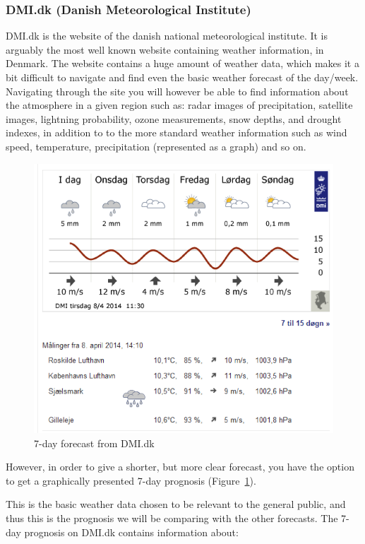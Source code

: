 

\subsubsection*{DMI.dk (Danish Meteorological Institute)} %
\label{ssub:dmi_dk_danish_meteorological_institute_}

DMI.dk is the website of the danish national meteorological institute. 
It is arguably the most well known website containing weather information, in Denmark. 
The website contains a huge amount of weather data, which makes it a bit difficult to navigate and find even the basic weather forecast of the day/week. 
Navigating through the site you will however be able to find information about the atmosphere in a given region such as:
radar images of precipitation, satellite images, lightning probability, ozone measurements, snow depths, and drought indexes, in addition to to the more standard weather information such as wind speed, temperature, precipitation (represented as a graph) and so on. 

\begin{figure}[!htbp]
     \centering
     \includegraphics[width=.75\textwidth]{images/Dmi1.png}
     \caption{7-day forecast from DMI.dk}
     \label{fig:dmi1}
 \end{figure}

However, in order to give a shorter, but more clear forecast, you have the option to get a graphically presented 7-day prognosis (Figure~\ref{fig:dmi1}).


This is the basic weather data chosen to be relevant to the general public, and thus this is the prognosis we will be comparing with the other forecasts. 
The 7-day prognosis on DMI.dk contains information about:

